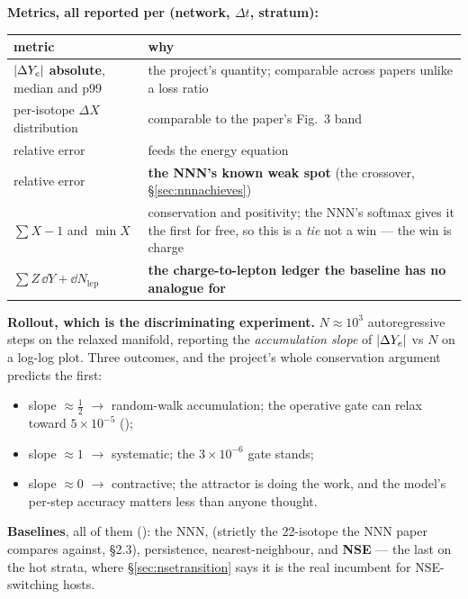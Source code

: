 \textbf{Metrics, all reported per (network, $\Delta t$, \Tn{} stratum):}

\begingroup\small
\begin{tabularx}{\textwidth}{@{}L{4.6cm} Y@{}}
\toprule
\textbf{metric} & \textbf{why} \\
\midrule
$|\Delta Y_{e}|$ \textbf{absolute}, median and p99 & the project's quantity;
  comparable across papers unlike a loss ratio \\
per-isotope $\Delta X$ distribution & comparable to the paper's Fig.~3 band \\
\enuc{} relative error & feeds the energy equation \\
\epsnu{} relative error & \textbf{the NNN's known weak spot} (the crossover,
  \S\ref{sec:nnnachieves}) \\
$\sum X - 1$ and $\min X$ & conservation and positivity; the NNN's softmax
  gives it the first for free, so this is a \emph{tie} not a win --- the win is
  charge \\
$\sum Z\,\dd Y + \dd N_{\mathrm{lep}}$ & \textbf{the charge-to-lepton ledger
  the baseline has no analogue for} \\
\bottomrule
\end{tabularx}
\endgroup

\textbf{Rollout, which is the discriminating experiment.} $N \approx 10^3$
autoregressive steps on the relaxed manifold, reporting the \emph{accumulation
slope} of $|\Delta Y_{e}|$ vs $N$ on a log-log plot. Three outcomes, and the project's
whole conservation argument predicts the first:

\begin{itemize}
\item slope $\approx \tfrac12$ $\to$ random-walk accumulation; the operative
  gate can relax toward $5 \times 10^{-5}$ ();
\item slope $\approx 1$ $\to$ systematic; the $3 \times 10^{-6}$ gate stands;
\item slope $\approx 0$ $\to$ contractive; the attractor is doing the work, and
  the model's per-step accuracy matters less than anyone thought.
\end{itemize}

\textbf{Baselines}, all of them (): the NNN, 
(strictly the 22-isotope  the NNN paper
compares against, \S 2.3), persistence, nearest-neighbour, and \textbf{NSE} ---
the last on the hot strata, where \S\ref{sec:nsetransition} says it is the real
incumbent for NSE-switching hosts.

